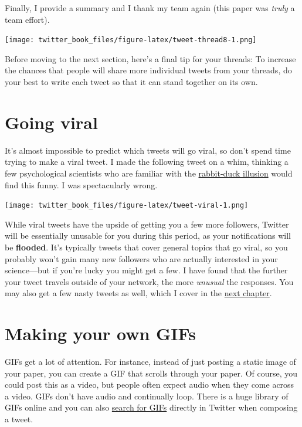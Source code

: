 \documentclass[
]{book}
\begin{document}
Finally, I provide a summary and I thank my team again (this paper was \emph{truly} a team effort).

\texttt{[image: twitter\_book\_files/figure-latex/tweet-thread8-1.png]}

Before moving to the next section, here's a final tip for your threads: To increase the chances that people will share more individual tweets from your threads, do your best to write each tweet so that it can stand together on its own.

\hypertarget{going-viral}{%
\section*{Going viral}\label{going-viral}}

It's almost impossible to predict which tweets will go viral, so don't spend time trying to make a viral tweet. I made the following tweet on a whim, thinking a few psychological scientists who are familiar with the \href{https://en.wikipedia.org/wiki/Rabbit\%E2\%80\%93duck_illusion}{rabbit-duck illusion} would find this funny. I was spectacularly wrong.

\texttt{[image: twitter\_book\_files/figure-latex/tweet-viral-1.png]}

While viral tweets have the upside of getting you a few more followers, Twitter will be essentially unusable for you during this period, as your notifications will be \textbf{flooded}. It's typically tweets that cover general topics that go viral, so you probably won't gain many new followers who are actually interested in your science---but if you're lucky you might get a few. I have found that the further your tweet travels outside of your network, the more \emph{unusual} the responses. You may also get a few nasty tweets as well, which I cover in the \protect\hyperlink{care}{next chapter}.

\hypertarget{making-your-own-gifs}{%
\section*{Making your own GIFs}\label{making-your-own-gifs}}

GIFs get a lot of attention. For instance, instead of just posting a static image of your paper, you can create a GIF that scrolls through your paper. Of course, you could post this as a video, but people often expect audio when they come across a video. GIFs don't have audio and continually loop. There is a huge library of GIFs online and you can also \href{https://help.twitter.com/en/using-twitter/tweeting-gifs-and-pictures}{search for GIFs} directly in Twitter when composing a tweet.
\end{document}
